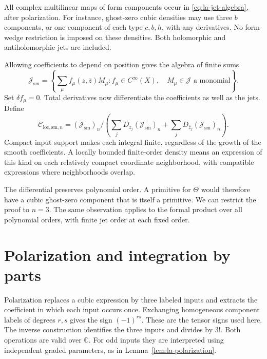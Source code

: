 All complex multilinear maps of form components occur in
\eqref{eq:la-jet-algebra}, after polarization. For instance,
ghost-zero cubic densities may use three $b$ components, or one
component of each type $c,b,h$, with any derivatives.
No form-wedge restriction is imposed on these densities.
Both holomorphic and antiholomorphic jets are included.

Allowing coefficients to depend on position gives the algebra
of finite sums
\begin{equation}\label{eq:la-smooth-jets}
 \mathcal J_{\mathrm{sm}}
 =\left\{\sum_\mu f_\mu(z,\bar z)M_\mu:
       f_\mu\in C^\infty(X),\quad M_\mu\in\mathcal J
       \text{ a monomial}\right\}.
\end{equation}
Set $\delta f_\mu=0$. Total derivatives now differentiate the
coefficients as well as the jets. Define
\begin{equation}\label{eq:la-local-sm}
 \mathcal C_{\mathrm{loc,sm},n}
 = (\mathcal J_{\mathrm{sm}})_n\Big/
  \left(\sum_jD_{z_j}(\mathcal J_{\mathrm{sm}})_n
           +\sum_jD_{\bar z_j}(\mathcal J_{\mathrm{sm}})_n\right).
\end{equation}
Compact input support makes each integral finite, regardless of
the growth of the smooth coefficients. A locally bounded
finite-order density means an expression of this kind on each
relatively compact coordinate neighborhood, with compatible
expressions where neighborhoods overlap.

The differential preserves polynomial order. A primitive for
$\Theta$ would therefore have a cubic ghost-zero component
that is itself a primitive. We can restrict the proof to $n=3$.
The same observation applies to the formal product over all
polynomial orders, with finite jet order at each fixed order.

\section{Polarization and integration by parts}
\label{sec:la-normal-form}

Polarization replaces a cubic expression by three labeled
inputs and extracts the coefficient in which each input occurs
once. Exchanging homogeneous component labels of degrees $r,s$
gives the sign $(-1)^{rs}$. These are the tensor signs used here.
The inverse construction identifies the three inputs and divides
by $3!$. Both operations are valid over $\mathbb C$.
For odd inputs they are interpreted using independent graded
parameters, as in Lemma~\ref{lem:la-polarization}.

